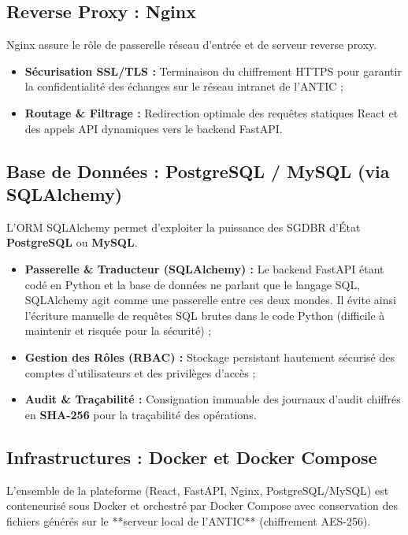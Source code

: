\subsection{Reverse Proxy : Nginx}

Nginx assure le rôle de passerelle réseau d'entrée et de serveur reverse proxy.
\begin{itemize}
    \item \textbf{Sécurisation SSL/TLS :} Terminaison du chiffrement HTTPS pour garantir la confidentialité des échanges sur le réseau intranet de l'ANTIC ;
    \item \textbf{Routage \& Filtrage :} Redirection optimale des requêtes statiques React et des appels API dynamiques vers le backend FastAPI.
\end{itemize}

\subsection{Base de Données : PostgreSQL / MySQL (via SQLAlchemy)}

L'ORM SQLAlchemy permet d'exploiter la puissance des SGDBR d'État \textbf{PostgreSQL} ou \textbf{MySQL}.
\begin{itemize}
    \item \textbf{Passerelle \& Traducteur (SQLAlchemy) :} Le backend FastAPI étant codé en Python et la base de données ne parlant que le langage SQL, SQLAlchemy agit comme une passerelle entre ces deux mondes. Il évite ainsi l'écriture manuelle de requêtes SQL brutes dans le code Python (difficile à maintenir et risquée pour la sécurité) ;
    \item \textbf{Gestion des Rôles (RBAC) :} Stockage persistant hautement sécurisé des comptes d'utilisateurs et des privilèges d'accès ;
    \item \textbf{Audit \& Traçabilité :} Consignation immuable des journaux d'audit chiffrés en \textbf{SHA-256} pour la traçabilité des opérations.
\end{itemize}

\subsection{Infrastructures : Docker et Docker Compose}

L'ensemble de la plateforme (React, FastAPI, Nginx, PostgreSQL/MySQL) est conteneurisé sous Docker et orchestré par Docker Compose avec conservation des fichiers générés sur le **serveur local de l'ANTIC** (chiffrement AES-256).

